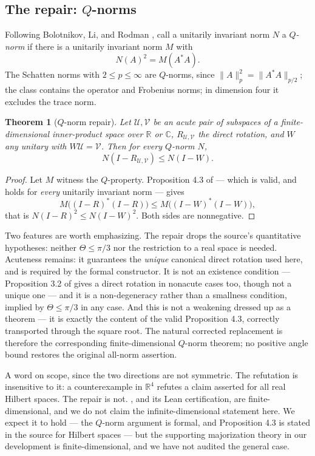 \documentclass[11pt]{article}
\newtheorem{theorem}{Theorem}[section]
\theoremstyle{definition}
\newcommand{\R}{\mathbb R}
\begin{document}
\subsection{The repair: \texorpdfstring{$Q$}{Q}-norms}

Following Bolotnikov, Li, and Rodman \cite{BolotnikovLiRodman2001}, call a
unitarily invariant norm $N$ a \emph{$Q$-norm} if there is a unitarily
invariant norm $M$ with
\[
 N(A)^2=M(A^*A).
\]
The Schatten norms with $2\leq p\leq\infty$ are $Q$-norms, since
$\lVert A\rVert_p^2=\lVert A^*A\rVert_{p/2}$; the class contains the operator
and Frobenius norms; in dimension four it excludes the trace norm.

\begin{theorem}[$Q$-norm repair]
\label{thm:qnorm}
Let $\mathcal U,\mathcal V$ be an acute pair of subspaces of a finite-dimensional
inner-product space over $\R$ or $\mathbb C$, $R_{\mathcal U,\mathcal V}$
the direct rotation, and $W$ any unitary with $W\mathcal U=\mathcal V$.  Then
for every $Q$-norm $N$,
\[
 N(I-R_{\mathcal U,\mathcal V})\leq N(I-W).
\]
\end{theorem}

\begin{proof}
Let $M$ witness the $Q$-property.  Proposition 4.3 of \cite{DavisKahan1970} —
which is valid, and holds for \emph{every} unitarily invariant norm — gives
\[
 M\bigl((I-R)^*(I-R)\bigr)\leq M\bigl((I-W)^*(I-W)\bigr),
\]
that is $N(I-R)^2\leq N(I-W)^2$.  Both sides are nonnegative.
\end{proof}

Two features are worth emphasizing.  The repair drops the source's
quantitative hypotheses: neither $\Theta\leq\pi/3$ nor the restriction to a
real space is needed.  Acuteness remains: it guarantees the \emph{unique}
canonical direct rotation used here, and is required by the formal constructor.
It is not an existence condition --- Proposition 3.2 of \cite{DavisKahan1970}
gives a direct rotation in nonacute cases too, though not a unique one --- and
it is a non-degeneracy rather than a smallness condition, implied by
$\Theta\leq\pi/3$ in any case.  And this is not a weakening dressed up as a
theorem — it is
exactly the content of the valid Proposition 4.3, correctly transported through
the square root.  The natural corrected replacement is therefore the corresponding
finite-dimensional $Q$-norm theorem; no positive angle bound restores the
original all-norm assertion.

A word on scope, since the two directions are not symmetric.  The refutation is
insensitive to it: a counterexample in $\R^4$ refutes a claim asserted for all
real Hilbert spaces.  The repair is not.  , and its Lean
certification, are finite-dimensional, and we do not claim the
infinite-dimensional statement here.  We expect it to hold --- the $Q$-norm
argument is formal, and Proposition 4.3 is stated in the source for Hilbert
spaces --- but the supporting majorization theory in our development is
finite-dimensional, and we have not audited the general case.
\end{document}
